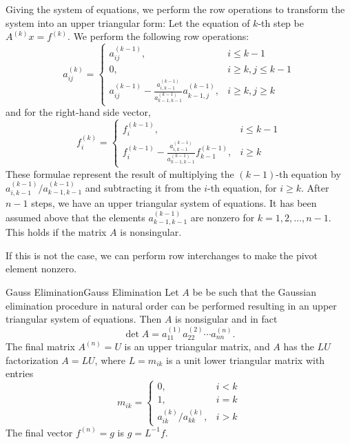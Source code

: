 \documentclass[../main.tex]{subfiles}
\begin{document}
Giving the system of equations, we perform the row operations to transform the system into an upper triangular form: Let the equation of $k$-th step be $A^{(k)} x = f^{(k)}$. We perform the following row operations:
\begin{equation} \label{eq:gauss-elimination-coefficients}
	a_{ij}^{(k)} =
	\begin{cases}
		a_{ij}^{(k-1)},                                                                   & i \leq k-1           \\
		0,                                                                                & i \geq k, j \leq k-1 \\
		a_{ij}^{(k-1)} - \frac{a_{i,k-1}^{(k-1)}}{a_{k-1,k-1}^{(k-1)}} a_{k-1,j}^{(k-1)}, & i \geq k, j \geq k
	\end{cases}
\end{equation}
and for the right-hand side vector,
\begin{equation} \label{eq:gauss-elimination-right-hand-side}
	f_i^{(k)} =
	\begin{cases}
		f_i^{(k-1)},                                                                 & i \leq k-1 \\
		f_i^{(k-1)} - \frac{a_{i,k-1}^{(k-1)}}{a_{k-1,k-1}^{(k-1)}} f_{k-1}^{(k-1)}, & i \geq k
	\end{cases}
\end{equation}
These formulae represent the result of multiplying the $(k-1)$-th equation by $a_{i,k-1}^{(k-1)}/a_{k-1,k-1}^{(k-1)}$ and subtracting it from the $i$-th equation, for $i \geq k$. After $n-1$ steps, we have an upper triangular system of equations. It has been assumed above that the elements $a_{k-1,k-1}^{(k-1)}$ are nonzero for $k=1,2,\ldots,n-1$. This holds if the matrix $A$ is nonsingular.

If this is not the case, we can perform row interchanges to make the pivot element nonzero.

\begin{theorem}{Gauss Elimination}{Gauss Elimination}
	Let $A$ be be such that the Gaussian elimination procedure in natural order can be performed resulting in an upper triangular system of equations. Then $A$ is nonsigular and in fact
	\begin{equation}
		\det A = a_{11}^{(1)} a_{22}^{(2)} \cdots a_{nn}^{(n)}.
	\end{equation}
	The final matrix $A^{(n)} = U$ is an upper triangular matrix, and $A$ has the $LU$ factorization $A = LU$, where $L = m_{ik}$ is a unit lower triangular matrix with entries
	\begin{equation*}
		m_{ik} =
		\begin{cases}
			0,                           & i < k \\
			1,                           & i = k \\
			a_{ik}^{(k)} / a_{kk}^{(k)}, & i > k
		\end{cases}
	\end{equation*}
	The final vector $f^{(n)} = g$ is $g = L^{-1} f$.
\end{theorem}
\end{document}
